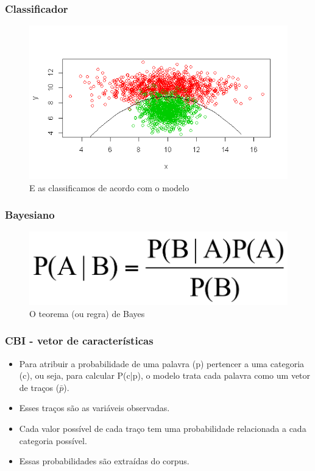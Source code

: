 \documentclass[xcolor=table]{beamer}
\begin{document}
	\begin{frame}
		\frametitle{Classificador}
		\begin{figure}
\centering
\includegraphics[width=0.7\linewidth]{classes-bonito}
\caption{E as classificamos de acordo com o modelo}

\label{fig:classes-bonito}
\end{figure}

	\end{frame}
	\begin{frame}
		\frametitle{Bayesiano}
		\begin{figure}
\centering
\includegraphics[width=0.7\linewidth]{bayes-limpo}
\caption{O teorema (ou regra) de Bayes}
\label{fig:bayes-limpo}
\end{figure}

	\end{frame}
	\begin{frame}
		\frametitle{CBI - vetor de características}
		\begin{itemize}
			\item Para atribuir a probabilidade de uma palavra (p) pertencer a uma categoria (c), ou seja, para calcular P(c|p), o modelo trata cada palavra como um vetor de traços ($\bar{p}$).\\
			\item Esses traços são as variáveis observadas.\\
			\item Cada valor possível de cada traço tem uma probabilidade relacionada a cada categoria possível.\\
			\item Essas probabilidades são extraídas do corpus.\\
		\end{itemize}
	\end{frame}	
\end{document}
